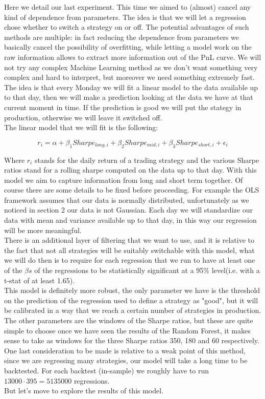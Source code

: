 Here we detail our last experiment. This time we aimed to (almost) cancel any kind of dependence from parameters. The idea is that we will let a regression chose whether to switch a strategy on or off. The potential advantages of such methods are multiple: in fact reducing the dependence from parameters we basically cancel the possibility of overfitting, while letting a model work on the raw information allows to extract more information out of the PnL curve. We will not try any complex Machine Learning method as we don't want something very complex and hard to interpret, but moreover we need something extremely fast. The idea is that every Monday we will fit a linear model to the data available up to that day, then we will make a prediction looking at the data we have at that current moment in time. If the prediction is good we will put the  stategy in production, otherwise we will leave it switched off.\\
The linear model that we will fit is the following:

\begin{equation} \label{OLS}
r_i = \alpha + \beta_1 Sharpe_{long,i} + \beta_2 Sharpe_{mid,i} + \beta_3 Sharpe_{short,i}  + \epsilon_i 
\end{equation}

Where $r_i$ stands for the daily return of a trading strategy and the various Sharpe ratios stand for a rolling sharpe computed on the data up to that day. With this model we aim to capture information from long and short term together. Of course there are some details to be fixed before proceeding. For example the OLS framework assumes that our data is normally distributed, unfortunately as we noticed in section 2 our data is not Gaussian. Each day we will standardize our data with mean and variance available up to that day, in this way our regression will be more meaningful.\\
There is an additional layer of filtering that we want to use, and it is relative to the fact that not all strategies will be suitably switchable with this model, what we will do then is to require for each regression that we run to have at least one of the $\beta s$ of the regressions to be statistically significant at a 95\% level(i.e. with a t-stat of at least 1.65).\\
This model is definitely more robust, the only parameter we have is the threshold on the prediction of the regression used to define a strategy as "good", but it will be calibrated in a way that we reach a certain number of strategies in production. The other parameters are the windows of the Sharpe ratios, but these are quite simple to choose once we have seen the results of the Random Forest, it makes sense to take as windows for the three Sharpe ratios 350, 180 and 60 respectively.\\
One last  consideration to be made is relative to a weak point of this method, since we are regressing many strategies, our model will take a long time to be backtested. For each backtest (in-sample) we roughly have to run $13000 \cdot 395 = 5135000$ regressions.\\
But let's move to explore the results of this model. 